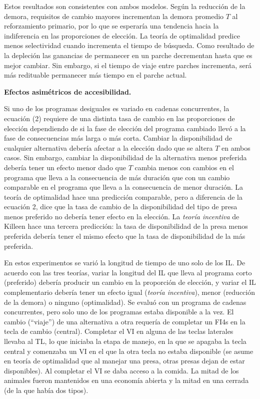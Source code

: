 \documentclass[a4paper,12pt]{article}
\begin{document}
Estos resultados son consistentes con ambos modelos. Según la reducción de la demora, requisitos de cambio mayores incrementan la demora promedio $T$ al reforzamiento primario, por lo que se esperaría una tendencia hacia la indiferencia en las proporciones de elección. La teoría de optimalidad predice menos selectividad cuando incrementa el tiempo de búsqueda. Como resultado de la depleción las ganancias de permanecer en un parche decrementan hasta que es mejor cambiar. Sin embargo, si el tiempo de viaje entre parches incrementa, será más redituable permanecer más tiempo en el parche actual.

{\bfseries Efectos asimétricos de accesibilidad.}

Si uno de los programas desiguales es variado en cadenas concurrentes, la ecuación (2) requiere de una distinta tasa de cambio en las proporciones de elección dependiendo de si la fase de elección del programa cambiado llevó a la fase de consecuencias más larga o más corta. Cambiar la disponibilidad de cualquier alternativa debería afectar a la elección dado que se altera $T$ en ambos casos. Sin embargo, cambiar la disponibilidad de la alternativa menos preferida  debería tener un efecto menor dado que $T$ cambia menos con cambios en el programa que lleva a la consecuencia de más duración que con un cambio comparable en el programa que lleva a la consecuencia de menor duración. La teoría de optimalidad hace una predicción comparable, pero a diferencia de la ecuación 2, dice que la tasa de cambio de la disponibilidad del tipo de presa menos preferido no debería tener efecto en la elección. La {\itshape teoría incentiva} de Killeen hace una tercera predicción: la tasa de disponibilidad de la presa menos preferida debería tener el mismo efecto que la tasa de disponibilidad de la más preferida. 

En estos experimentos se varió la longitud de tiempo de uno solo de los IL. De acuerdo con las tres teorías, variar la longitud del IL que lleva al programa corto (preferido) debería producir un cambio en la proporción de elección, y variar el IL complementario debería tener un efecto igual ({\itshape teoría incentiva}), menor (reducción de la demora) o ninguno (optimalidad). Se evaluó con un programa de cadenas concurrentes, pero solo uno de los programas estaba disponible a la vez. El cambio (``viaje'') de una alternativa a otra requería de completar un FI4s en la tecla de cambio (central). Completar el VI en alguna de las teclas laterales llevaba al TL, lo que iniciaba la etapa de manejo, en la que se apagaba la tecla central y comenzaba un VI en el que la otra tecla no estaba disponible (se asume en teoría de optimalidad que al manejar una presa, otras presas dejan de estar disponibles). Al completar el VI se daba acceso a la comida. La mitad de los animales fueron mantenidos en una economía abierta y la mitad en una cerrada (de la que había dos tipos).
\end{document}
